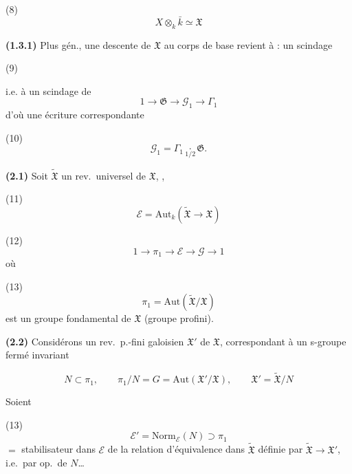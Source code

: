 \documentclass[11pt,a4paper]{article}
\begin{document}
(8)
\[
  X \otimes_k \bar{k} \simeq \mathfrak{X}
\]

\textbf{(1.3.1)} Plus gén., une descente de $\mathfrak{X}$ au corps de base  revient à : un scindage

(9)


i.e. à un scindage de
\[
  1 \to \mathfrak{G} \to \mathcal{G}_1 \to \Gamma_1
\]
d'où une écriture correspondante

(10)
\[
  \mathcal{G}_1 = \Gamma_1 \underset{1/2}{\cdot} \mathfrak{G} .
\]

\textbf{(2.1)} Soit $\widetilde{\mathfrak{X}}$ un rev.\ universel  de $\mathfrak{X}$,  , \ill{}

(11)
\[
  \mathcal{E} = \mathrm{Aut}_k(\widetilde{\mathfrak{X}} \to \mathfrak{X})
\]

(12)
\[
  1 \to \pi_1 \to \mathcal{E} \to \mathcal{G} \to 1
\]
où

(13)
\[
  \pi_1 = \mathrm{Aut}(\widetilde{\mathfrak{X}}/\mathfrak{X})
\]
est un groupe fondamental de $\mathfrak{X}$ (groupe profini).



\textbf{(2.2)} Considérons un rev.\ p.-fini galoisien $\mathfrak{X}'$ de $\mathfrak{X}$, correspondant à un s-groupe fermé invariant

\[
  N \subset \pi_1, \qquad \pi_1/N = G = \mathrm{Aut}(\mathfrak{X}'/\mathfrak{X}),
  \qquad \mathfrak{X}' = \widetilde{\mathfrak{X}}/N
\]

Soient

(13)
\[
  \mathcal{E}' = \mathrm{Norm}_{\mathcal{E}}(N) \supset \pi_1
\]
$=$ stabilisateur dans $\mathcal{E}$ de la relation d'équivalence dans $\widetilde{\mathfrak{X}}$ définie par $\widetilde{\mathfrak{X}} \to \mathfrak{X}'$, i.e.\ par op.\ de $N$\ldots
\end{document}
